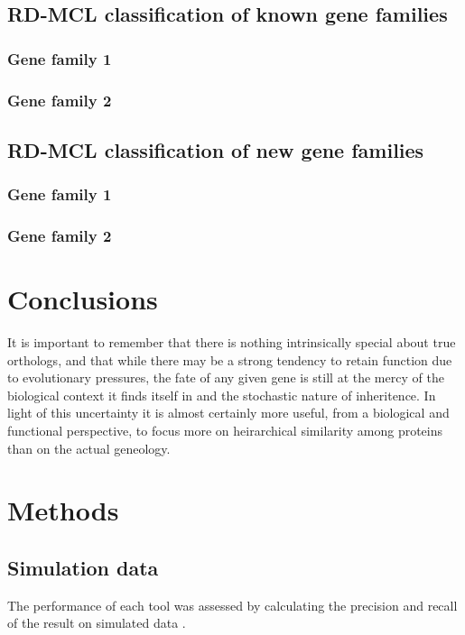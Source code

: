 \documentclass[twocolumn]{bmcart}%
\begin{document}
\subsection{RD-MCL classification of known gene families}
\lipsum[1]

\subsubsection{Gene family 1}
\lipsum[2]

\subsubsection{Gene family 2}
\lipsum[1]

\subsection{RD-MCL classification of new gene families}
\lipsum[1]

\subsubsection{Gene family 1}
\lipsum[2]

\subsubsection{Gene family 2}
\lipsum[1]

\section{Conclusions}
It is important to remember that there is nothing intrinsically special about true orthologs, and that while there may be a strong tendency to retain function due to evolutionary pressures, the fate of any given gene is still at the mercy of the biological context it finds itself in and the stochastic nature of inheritence. In light of this uncertainty it is almost certainly more useful, from a biological and functional perspective, to focus more on heirarchical similarity among proteins than on the actual geneology.

\section{Methods}
\subsection{Simulation data}
The performance of each tool was assessed by calculating the precision and recall of the result on simulated data \cite{Emms:2015ig}.
\end{document}
